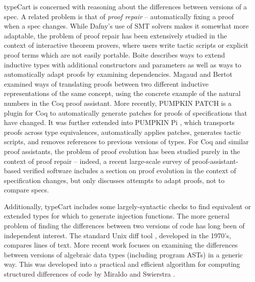 typeCart is concerned with reasoning about the differences between versions of a spec. A related problem is that of \emph{proof repair} -- automatically fixing a proof when a spec changes. While Dafny's use of SMT solvers makes it somewhat more adaptable, the problem of proof repair has been extensively studied in the context of interactive theorem provers, where users write tactic scripts or explicit proof terms which are not easily portable.
Boite \cite{ext-inductive-types} describes ways to extend inductive types with additional constructors and parameters as well as ways to automatically adapt proofs by examining dependencies. Magaud and Bertot \cite{nat-numbers} examined ways of translating proofs between two different inductive representations of the same concept, using the concrete example of the natural numbers in the Coq proof assistant.  More recently, PUMPKIN PATCH \cite{adapt-proofs} is a plugin for Coq to automatically generate patches for proofs of specifications that have changed. It was further extended into PUMPKIN Pi \cite{proof-repair}, which transports proofs across type equivalences, automatically applies patches, generates tactic scripts, and removes references to previous versions of types. For Coq and similar proof assistants, the problem of proof evolution has been studied purely in the context of proof repair -- indeed, a recent large-scale survey of proof-assistant-based verified software \cite{qed-at-large} includes a section on proof evolution in the context of specification changes, but only discusses attempts to adapt proofs, not to compare specs.

Additionally, typeCart includes some largely-syntactic checks to find equivalent or extended types for which to generate injection functions. The more general problem of finding the differences between two versions of code has long been of independent interest. The standard Unix diff tool \cite{diff}, developed in the 1970's, compares lines of text. More recent work \cite{type-directed-diff} focuses on examining the differences between versions of algebraic data types (including program ASTs) in a generic way. This was developed into a practical and efficient algorithm for computing structured differences of code by Miraldo and Swierstra \cite{algo-diff}.